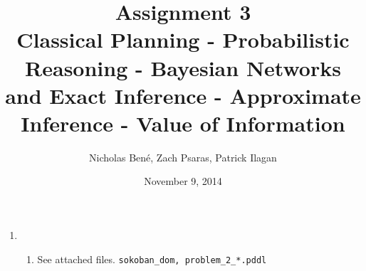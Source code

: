 \documentclass[12pt,a4paper]{report}
\begin{document}
\title{Assignment 3 \\ \small{Classical Planning - Probabilistic Reasoning - Bayesian Networks and Exact Inference - Approximate Inference - Value of Information}}

\author{Nicholas Ben\'e, Zach Psaras, Patrick Ilagan}
\date{November 9, 2014}
\maketitle

\begin{enumerate}
	
\item	
\begin{enumerate}
	\item See attached files. \texttt{sokoban\_dom, problem\_2\_*.pddl}
	

\end{enumerate}
\end{enumerate}
\end{document}

